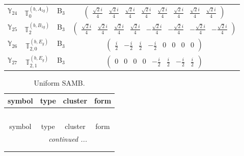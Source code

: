 \documentclass[fleqn,10pt,landscape]{article}
\begin{document}
\begin{itemize}
\begin{center}
\begin{longtable}{c|c|c|c}
$ \mathbb{Y}_{24} $ & $\mathbb{T}_{0}^{(b,A_{1g})}$ & B$_{3}$ & $\begin{pmatrix} \frac{\sqrt{2} i}{4} & \frac{\sqrt{2} i}{4} & \frac{\sqrt{2} i}{4} & \frac{\sqrt{2} i}{4} & \frac{\sqrt{2} i}{4} & \frac{\sqrt{2} i}{4} & \frac{\sqrt{2} i}{4} & \frac{\sqrt{2} i}{4} \end{pmatrix}$ \\
$ \mathbb{Y}_{25} $ & $\mathbb{T}_{2}^{(b,B_{1g})}$ & B$_{3}$ & $\begin{pmatrix} \frac{\sqrt{2} i}{4} & \frac{\sqrt{2} i}{4} & \frac{\sqrt{2} i}{4} & \frac{\sqrt{2} i}{4} & - \frac{\sqrt{2} i}{4} & - \frac{\sqrt{2} i}{4} & - \frac{\sqrt{2} i}{4} & - \frac{\sqrt{2} i}{4} \end{pmatrix}$ \\
$ \mathbb{Y}_{26} $ & $\mathbb{T}_{2,0}^{(b,E_{g})}$ & B$_{3}$ & $\begin{pmatrix} \frac{i}{2} & - \frac{i}{2} & \frac{i}{2} & - \frac{i}{2} & 0 & 0 & 0 & 0 \end{pmatrix}$ \\
$ \mathbb{Y}_{27} $ & $\mathbb{T}_{2,1}^{(b,E_{g})}$ & B$_{3}$ & $\begin{pmatrix} 0 & 0 & 0 & 0 & - \frac{i}{2} & \frac{i}{2} & - \frac{i}{2} & \frac{i}{2} \end{pmatrix}$ \\
\end{longtable}
\end{center}
\begin{center}
\renewcommand{\arraystretch}{1.3}
\begin{longtable}{c|c|c|c}
\caption{Uniform SAMB.}
 \\
 \hline \hline
symbol & type & cluster & form \\ \hline \endfirsthead

\multicolumn{3}{l}{\tablename\ \thetable{}} \\
 \hline \hline
symbol & type & cluster & form \\ \hline \endhead

 \hline \hline
\multicolumn{3}{r}{\footnotesize\it continued ...} \\ \endfoot

 \hline \hline
\multicolumn{3}{r}{} \\ \endlastfoot


\end{longtable}
\end{center}
\end{itemize}
\end{document}
